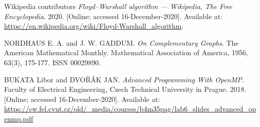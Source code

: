 \documentclass[11pt,a4paper]{article}
\begin{document}
\begin{thebibliography}{1}
    Wikipedia contributors \textit{Floyd–Warshall algorithm --- {Wikipedia}{,} The Free Encyclopedia}. 2020. [Online; accessed 16-December-2020]. Available at:
      \url{https://en.wikipedia.org/wiki/Floyd-Warshall\_algorithm}.

    NORDHAUS E. A. and J. W. GADDUM. \emph{On Complementary Graphs}. The American Mathematical Monthly. Mathematical Association of America, 1956, 63(3), 175-177. ISSN 00029890.

    BUKATA Libor and DVO\v{R}\'{A}K JAN. \emph{Advanced Programming With OpenMP}. Faculty of Electrical Engineering, Czech Technical University in Prague. 2018. [Online; accessed 16-December-2020]. Available at: \url{https://cw.fel.cvut.cz/old/_media/courses/b4m35pag/lab6_slides_advanced_openmp.pdf}

\end{thebibliography}

\end{document}
